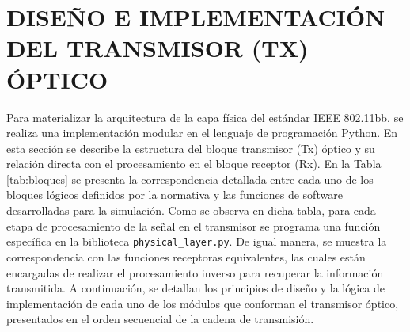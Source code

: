 \section{DISEÑO E IMPLEMENTACIÓN DEL TRANSMISOR (TX) ÓPTICO}
Para materializar la arquitectura de la capa física del estándar IEEE 802.11bb, se realiza una implementación modular en el lenguaje de programación Python. En esta sección se describe la estructura del bloque transmisor (Tx) óptico y su relación directa con el procesamiento en el bloque receptor (Rx). En la Tabla \ref{tab:bloques} se presenta la correspondencia detallada entre cada uno de los bloques lógicos definidos por la normativa y las funciones de software desarrolladas para la simulación. Como se observa en dicha tabla, para cada etapa de procesamiento de la señal en el transmisor se programa una función específica en la biblioteca \texttt{physical\_layer.py}. De igual manera, se muestra la correspondencia con las funciones receptoras equivalentes, las cuales están encargadas de realizar el procesamiento inverso para recuperar la información transmitida. A continuación, se detallan los principios de diseño y la lógica de implementación de cada uno de los módulos que conforman el transmisor óptico, presentados en el orden secuencial de la cadena de transmisión.


